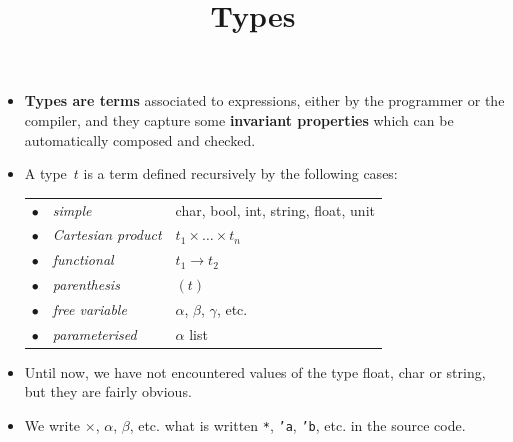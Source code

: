 \documentclass[wide]{slides}
\begin{document}
\begin{slide}
  \title{Types}

  \begin{itemize}

    \item \textbf{Types are terms} associated to expressions, either
      by the programmer or the compiler, and they capture some
      \textbf{invariant properties} which can be automatically
      composed and checked.

    \item A type~$t$ is a term defined recursively by the following
      cases:\\
      \smallskip
      \begin{tabular}{r@{\,\,}ll}
        $\bullet$
        & \emph{simple}
        & \textsf{char}, \textsf{bool}, \textsf{int}, \textsf{string},
        \textsf{float}, \textsf{unit}\\
        $\bullet$
        & \emph{Cartesian product}
        & $t_1 \times \ldots \times t_n$\\
        $\bullet$
        & \emph{functional}
        & $t_1 \rightarrow t_2$\\
        $\bullet$
        & \emph{parenthesis}
        & $(t)$\\
        $\bullet$
        & \emph{free variable}
        & $\alpha$, $\beta$, $\gamma$, etc. \\
        $\bullet$
        & \emph{parameterised}
        & $\alpha$ \textsf{list}
      \end{tabular}

    \item Until now, we have not encountered values of the type
      \textsf{float}, \textsf{char} or \textsf{string}, but they are
      fairly obvious.

    \item We write $\times$, $\alpha$, $\beta$, etc. what is written
      \texttt{*}, \texttt{'a}, \texttt{'b}, etc. in the source code.

  \end{itemize}

\end{slide}
\end{document}
